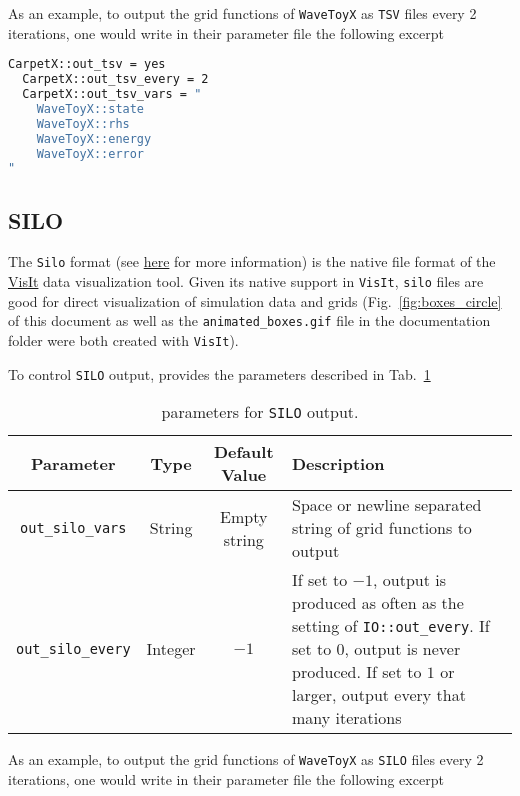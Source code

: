 As an example, to output the grid functions of \texttt{WaveToyX} as \texttt{TSV} files every 2 iterations, one would write in their parameter file the following excerpt

\begin{lstlisting}[language=bash]
  CarpetX::out_tsv = yes
  CarpetX::out_tsv_every = 2
  CarpetX::out_tsv_vars = "
    WaveToyX::state
    WaveToyX::rhs
    WaveToyX::energy
    WaveToyX::error
"
\end{lstlisting}

\subsection{SILO}
\label{sec:silo}

The \texttt{Silo} format (see \href{https://visit-sphinx-github-user-manual.readthedocs.io/en/develop/data_into_visit/SiloFormat.html}{here} for more information) is the native file format of the \href{https://sd.llnl.gov/simulation/computer-codes/visit}{VisIt} data visualization tool. Given its native support in \texttt{VisIt}, \texttt{silo} files are good for direct visualization of simulation data and grids (Fig.~\ref{fig:boxes_circle} of this document as well as the \texttt{animated\_boxes.gif} file in the documentation folder were both created with \texttt{VisIt}).

To control \texttt{SILO} output, \CarpetX\space provides the parameters described in Tab.~\ref{tab:silo_params}

\begin{table}[ht]
  \centering
  \begin{tabularx}{\textwidth}{cccX}
    Parameter                 & Type    & Default Value  & Description \\\hline\hline
    \texttt{out\_silo\_vars}  & String  & Empty string   & Space or newline separated string of grid functions to output \\
    \texttt{out\_silo\_every} & Integer & $-1$           & If set to $-1$, output is produced as often as the setting of \texttt{IO::out\_every}. If set to $0$, output is never produced. If set to $1$ or larger, output every that many iterations \\\hline\hline
  \end{tabularx}
  \label{tab:silo_params}
  \caption{\CarpetX\space parameters for \texttt{SILO} output.}
\end{table}

As an example, to output the grid functions of \texttt{WaveToyX} as \texttt{SILO} files every 2 iterations, one would write in their parameter file the following excerpt

